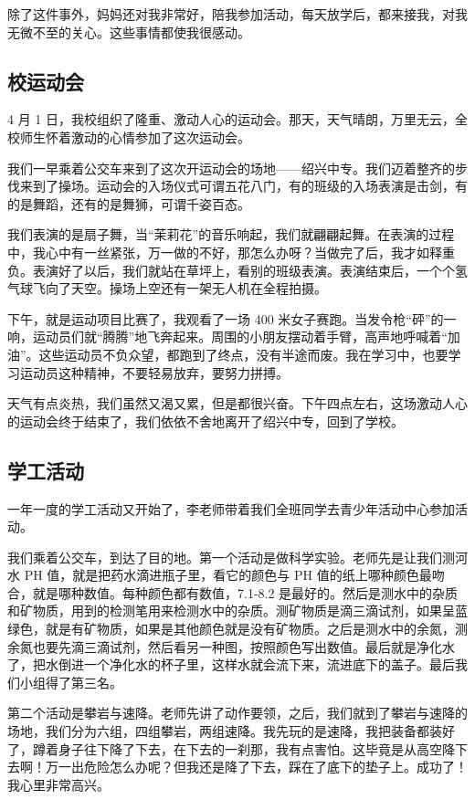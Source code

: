 \documentclass[UTF8,a4paper,titlepage,twoside,10.5pt]{article}
\begin{document}
除了这件事外，妈妈还对我非常好，陪我参加活动，每天放学后，都来接我，对我无微不至的关心。这些事情都使我很感动。

\subsection{校运动会}
\label{sec:org757f5fc}

4 月 1 日，我校组织了隆重、激动人心的运动会。那天，天气晴朗，万里无云，全校师生怀着激动的心情参加了这次运动会。

我们一早乘着公交车来到了这次开运动会的场地——绍兴中专。我们迈着整齐的步伐来到了操场。运动会的入场仪式可谓五花八门，有的班级的入场表演是击剑，有的是舞蹈，还有的是舞狮，可谓千姿百态。

我们表演的是扇子舞，当“茉莉花”的音乐响起，我们就翩翩起舞。在表演的过程中，我心中有一丝紧张，万一做的不好，那怎么办呀？当做完了后，我才如释重负。表演好了以后，我们就站在草坪上，看别的班级表演。表演结束后，一个个氢气球飞向了天空。操场上空还有一架无人机在全程拍摄。

下午，就是运动项目比赛了，我观看了一场 400 米女子赛跑。当发令枪“砰”的一响，运动员们就“腾腾”地飞奔起来。周围的小朋友摆动着手臂，高声地呼喊着“加油”。这些运动员不负众望，都跑到了终点，没有半途而废。我在学习中，也要学习运动员这种精神，不要轻易放弃，要努力拼搏。

天气有点炎热，我们虽然又渴又累，但是都很兴奋。下午四点左右，这场激动人心的运动会终于结束了，我们依依不舍地离开了绍兴中专，回到了学校。

\subsection{学工活动}
\label{sec:org3e0d24a}

一年一度的学工活动又开始了，李老师带着我们全班同学去青少年活动中心参加活动。

我们乘着公交车，到达了目的地。第一个活动是做科学实验。老师先是让我们测河水 PH 值，就是把药水滴进瓶子里，看它的颜色与 PH 值的纸上哪种颜色最吻合，就是哪种数值。每种颜色都有数值，7.1-8.2 是最好的。然后是测水中的杂质和矿物质，用到的检测笔用来检测水中的杂质。测矿物质是滴三滴试剂，如果呈蓝绿色，就是有矿物质，如果是其他颜色就是没有矿物质。之后是测水中的余氮，测余氮也要先滴三滴试剂，然后看另一种图，按照颜色写出数值。最后就是净化水了，把水倒进一个净化水的杯子里，这样水就会流下来，流进底下的盖子。最后我们小组得了第三名。

第二个活动是攀岩与速降。老师先讲了动作要领，之后，我们就到了攀岩与速降的场地，我们分为六组，四组攀岩，两组速降。我先玩的是速降，我把装备都装好了，蹲着身子往下降了下去，在下去的一刹那，我有点害怕。这毕竟是从高空降下去啊！万一出危险怎么办呢？但我还是降了下去，踩在了底下的垫子上。成功了！我心里非常高兴。
\end{document}
